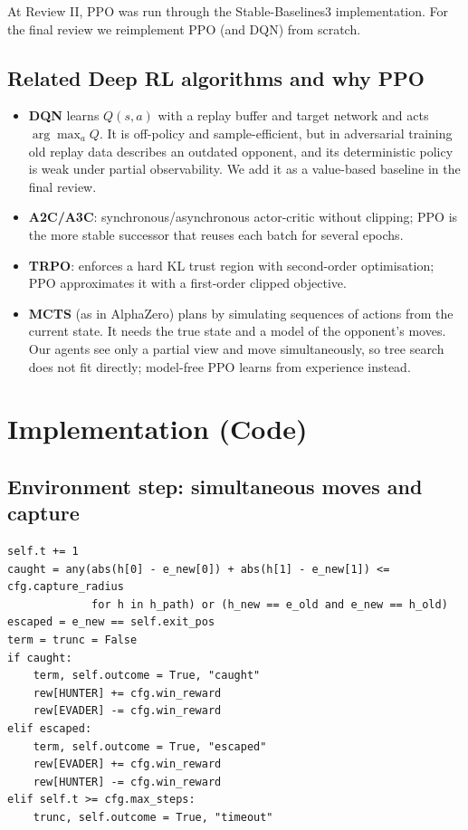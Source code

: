 \documentclass[11pt,a4paper]{article}
\newcommand{\code}[1]{\texttt{#1}}
\begin{document}
At Review II, PPO was run through the Stable-Baselines3 implementation. For the final review we
reimplement PPO (and DQN) from scratch.

\subsection{Related Deep RL algorithms and why PPO}
\begin{itemize}
  \item \textbf{DQN} learns $Q(s,a)$ with a replay buffer and target network and acts
        $\arg\max_a Q$. It is off-policy and sample-efficient, but in adversarial training
        old replay data describes an outdated opponent, and its deterministic policy is weak under
        partial observability. We add it as a value-based baseline in the final review.
  \item \textbf{A2C/A3C}: synchronous/asynchronous actor-critic without clipping; PPO is the
        more stable successor that reuses each batch for several epochs.
  \item \textbf{TRPO}: enforces a hard KL trust region with second-order optimisation; PPO
        approximates it with a first-order clipped objective.
  \item \textbf{MCTS} (as in AlphaZero) plans by simulating sequences of actions from the current
        state. It needs the true state and a model of the opponent's moves. Our agents see only a
        partial view and move simultaneously, so tree search does not fit directly; model-free PPO
        learns from experience instead.
\end{itemize}

\section{Implementation (Code)}

\subsection{Environment step: simultaneous moves and capture}
\begin{lstlisting}[title={\code{env/dungeon\_env.py} -- excerpt of \code{step}}]
self.t += 1
caught = any(abs(h[0] - e_new[0]) + abs(h[1] - e_new[1]) <= cfg.capture_radius
             for h in h_path) or (h_new == e_old and e_new == h_old)
escaped = e_new == self.exit_pos
term = trunc = False
if caught:
    term, self.outcome = True, "caught"
    rew[HUNTER] += cfg.win_reward
    rew[EVADER] -= cfg.win_reward
elif escaped:
    term, self.outcome = True, "escaped"
    rew[EVADER] += cfg.win_reward
    rew[HUNTER] -= cfg.win_reward
elif self.t >= cfg.max_steps:
    trunc, self.outcome = True, "timeout"
\end{lstlisting}
\end{document}
